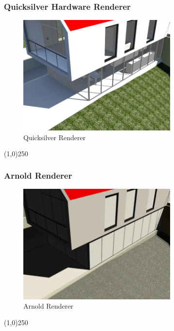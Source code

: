 \begin{frame}
\frametitle{Quicksilver Hardware Renderer}
\begin{figure}
	\centering
	\includegraphics[height=6cm]{img/RenderEngine/Revit3DSQuickSilver.jpg}
	\caption{Quicksilver Renderer}
	\label{fig:QuickSilver}
\end{figure}
\end{frame}
\begin{center}\line(1,0){250}\end{center}


\begin{frame}
\frametitle{Arnold Renderer}
\begin{figure}
	\centering
	\includegraphics[height=6cm]{img/RenderEngine/Revit3DSScanLine.jpg}
	\caption{Arnold Renderer}
	\label{fig:ArnoldRenderer}
\end{figure}
\end{frame}
\begin{center}\line(1,0){250}\end{center}

